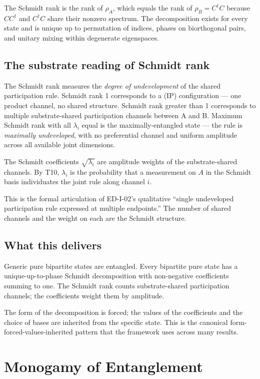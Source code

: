 \documentclass[11pt,a4paper]{article}
\begin{document}
The Schmidt rank is the rank of $\rho_A$, which equals the rank of $\rho_B = C^\dagger C$ because $CC^\dagger$ and $C^\dagger C$ share their nonzero spectrum. The decomposition exists for every state and is unique up to permutation of indices, phases on biorthogonal pairs, and unitary mixing within degenerate eigenspaces.

\subsection{The substrate reading of Schmidt rank}

The Schmidt rank measures the \emph{degree of undevelopment} of the shared participation rule. Schmidt rank 1 corresponds to a (IP) configuration --- one product channel, no shared structure. Schmidt rank greater than 1 corresponds to multiple substrate-shared participation channels between A and B. Maximum Schmidt rank with all $\lambda_i$ equal is the maximally-entangled state --- the rule is \emph{maximally undeveloped}, with no preferential channel and uniform amplitude across all available joint dimensions.

The Schmidt coefficients $\sqrt{\lambda_i}$ are amplitude weights of the substrate-shared channels. By T10, $\lambda_i$ is the probability that a measurement on $A$ in the Schmidt basis individuates the joint rule along channel $i$.

This is the formal articulation of ED-I-02's qualitative ``single undeveloped participation rule expressed at multiple endpoints.'' The number of shared channels and the weight on each are the Schmidt structure.

\subsection{What this delivers}

Generic pure bipartite states are entangled. Every bipartite pure state has a unique-up-to-phase Schmidt decomposition with non-negative coefficients summing to one. The Schmidt rank counts substrate-shared participation channels; the coefficients weight them by amplitude.

The form of the decomposition is forced; the values of the coefficients and the choice of bases are inherited from the specific state. This is the canonical form-forced-values-inherited pattern that the framework uses across many results.

\section{Monogamy of Entanglement}
\end{document}
